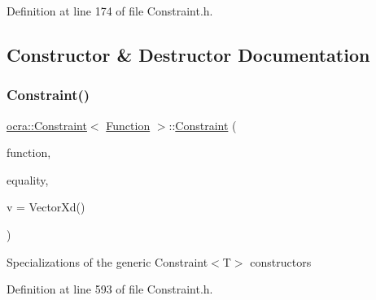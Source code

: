 Definition at line 174 of file Constraint.\+h.



\subsection{Constructor \& Destructor Documentation}
\hypertarget{classocra_1_1Constraint_3_01Function_01_4_aefef89fd502e8f1fed23be307f71b508}{}\label{classocra_1_1Constraint_3_01Function_01_4_aefef89fd502e8f1fed23be307f71b508} 
\subsubsection{\texorpdfstring{Constraint()}{Constraint()}\hspace{0.1cm}{\footnotesize\ttfamily [1/2]}}
{\footnotesize\ttfamily \hyperlink{classocra_1_1Constraint}{ocra\+::\+Constraint}$<$ \hyperlink{classocra_1_1Function}{Function} $>$\+::\hyperlink{classocra_1_1Constraint}{Constraint} (\begin{DoxyParamCaption}\item[{\hyperlink{classocra_1_1Function}{Function} $\ast$}]{function,  }\item[{bool}]{equality,  }\item[{const Vector\+Xd \&}]{v = {\ttfamily VectorXd()} }\end{DoxyParamCaption})\hspace{0.3cm}{\ttfamily [inline]}}

Specializations of the generic Constraint$<$\+T$>$ constructors 

Definition at line 593 of file Constraint.\+h.

\hypertarget{classocra_1_1Constraint_3_01Function_01_4_a9b8a02fdfb62c2d3d774552baccd268b}{}\label{classocra_1_1Constraint_3_01Function_01_4_a9b8a02fdfb62c2d3d774552baccd268b} 
